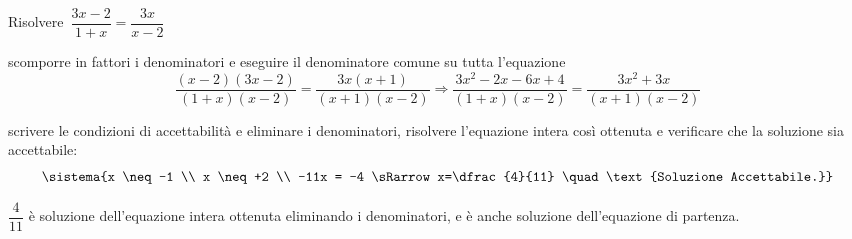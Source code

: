 % 
% 
% 

 \begin{esempio}
Risolvere~\(\dfrac{3x-2}{1+x}=\dfrac{3x}{x-2}\)
 
\begin{enumerate*}
\item scomporre in fattori i denominatori e eseguire il  denominatore comune 
su tutta l'equazione
\[\frac{(x-2)(3x-2)}{(1+x)(x-2)}=\frac{3x(x+1)}{(x+1)(x-2)}\Rightarrow
\frac{3x^{2}-2x-6x+4}{(1+x)(x-2)}=\frac{3x^2+3x}{(x+1)(x-2)}\]
\item scrivere le condizioni di accettabilità e eliminare i denominatori,
risolvere l'equazione intera così ottenuta e verificare che la soluzione sia 
accettabile:
\[\sistema{x \neq -1 \\ 
           x \neq +2 \\ 
           -11x = -4 \sRarrow x=\dfrac{4}{11} \quad 
             \text{Soluzione Accettabile.}}\]
\end{enumerate*}
\(\dfrac{4}{11}\) è soluzione dell'equazione intera ottenuta eliminando i 
denominatori, e è anche soluzione dell'equazione di partenza.
 \end{esempio}

